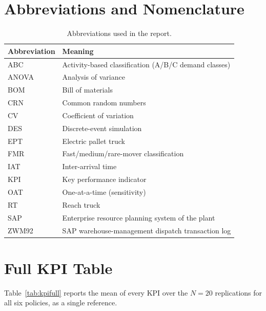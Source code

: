 \documentclass[12pt,a4paper]{article}
\begin{document}
\section{Abbreviations and Nomenclature}
\begin{table}[htbp]
\centering
\caption{Abbreviations used in the report.}
\label{tab:abbrev}
\begin{tabular}{ll}
\toprule
Abbreviation & Meaning \\
\midrule
ABC & Activity-based classification (A/B/C demand classes) \\
ANOVA & Analysis of variance \\
BOM & Bill of materials \\
CRN & Common random numbers \\
CV & Coefficient of variation \\
DES & Discrete-event simulation \\
EPT & Electric pallet truck \\
FMR & Fast/medium/rare-mover classification \\
IAT & Inter-arrival time \\
KPI & Key performance indicator \\
OAT & One-at-a-time (sensitivity) \\
RT & Reach truck \\
SAP & Enterprise resource planning system of the plant \\
ZWM92 & SAP warehouse-management dispatch transaction log \\
\bottomrule
\end{tabular}
\end{table}

\section{Full KPI Table}
Table~\ref{tab:kpifull} reports the mean of every KPI over the $N=20$
replications for all six policies, as a single reference.
\end{document}
